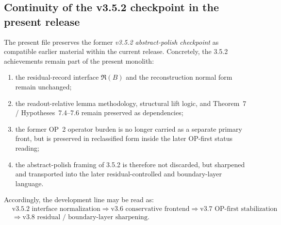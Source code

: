 \subsection*{Continuity of the v3.5.2 checkpoint in the present release}
The present file preserves the former \emph{v3.5.2 abstract-polish checkpoint} as compatible earlier material within the current release.
Concretely, the 3.5.2 achievements remain part of the present monolith:
\begin{enumerate}[leftmargin=2em,label=(\roman*)]
  \item the residual-record interface \(\mathfrak R(B)\) and the reconstruction normal form remain unchanged;
  \item the readout-relative lemma methodology, structural lift logic, and Theorem~7 / Hypotheses~7.4--7.6 remain preserved as dependencies;
  \item the former OP~2 operator burden is no longer carried as a separate primary front, but is preserved in reclassified form inside the later OP-first status reading;
  \item the abstract-polish framing of 3.5.2 is therefore not discarded, but sharpened and transported into the later residual-controlled and boundary-layer language.
\end{enumerate}
Accordingly, the development line may be read as:
\[
\begin{aligned}
&\text{v3.5.2 interface normalization}
\Longrightarrow
\text{v3.6 conservative frontend}
\Longrightarrow
\text{v3.7 OP-first stabilization}\\[0.2em]
&\Longrightarrow
\text{v3.8 residual / boundary-layer sharpening}.
\end{aligned}
\]


